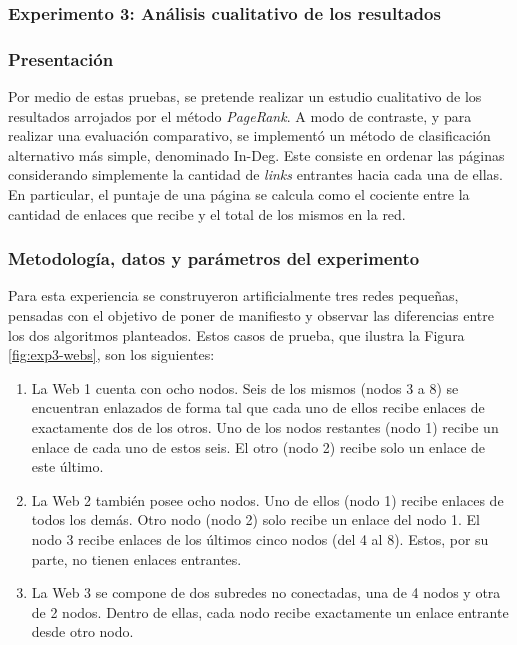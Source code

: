 \begin{figure}
\begin{center}
                    \label*{Resultados arrojados por el experimento 1. El gráfico de la izquierda representa el tiempo promedio de ejecución del algoritmo \emph{PageRank} en función de la cantidad de nodos de la red, y el de la derecha, en función de la cantidad de \emph{links} de la misma. Se representa también el desvío estándar de las mediciones.}
                \end{center}
            \end{figure}

        \subsubsection{Experimento 3: Análisis cualitativo de los resultados}

            \subsubsection*{Presentación}
            Por medio de estas pruebas, se pretende realizar un estudio cualitativo de los resultados arrojados por el método \emph{PageRank}. A modo de contraste, y para realizar una evaluación comparativo, se implementó un método de clasificación alternativo más simple, denominado In-Deg. Este consiste en ordenar las páginas considerando simplemente la cantidad de \emph{links} entrantes hacia cada una de ellas. En particular, el puntaje de una página se calcula como el cociente entre la cantidad de enlaces que recibe y el total de los mismos en la red.

            \subsubsection*{Metodología, datos y parámetros del experimento}
            Para esta experiencia se construyeron artificialmente tres redes pequeñas, pensadas con el objetivo de poner de manifiesto y observar las diferencias entre los dos algoritmos planteados. Estos casos de prueba, que ilustra la Figura \ref{fig:exp3-webs}, son los siguientes:
            \begin{enumerate}[label=(\alph*)]
                \item La Web 1 cuenta con ocho nodos. Seis de los mismos (nodos 3 a 8) se encuentran enlazados de forma tal que cada uno de ellos recibe enlaces de exactamente dos de los otros. Uno de los nodos restantes (nodo 1) recibe un enlace de cada uno de estos seis. El otro (nodo 2) recibe solo un enlace de este último.
                \item La Web 2 también posee ocho nodos. Uno de ellos (nodo 1) recibe enlaces de todos los demás. Otro nodo (nodo 2) solo recibe un enlace del nodo 1. El nodo 3 recibe enlaces de los últimos cinco nodos (del 4 al 8). Estos, por su parte, no tienen enlaces entrantes.
                \item La Web 3 se compone de dos subredes no conectadas, una de 4 nodos y otra de 2 nodos. Dentro de ellas, cada nodo recibe exactamente un enlace entrante desde otro nodo.
            \end{enumerate}


